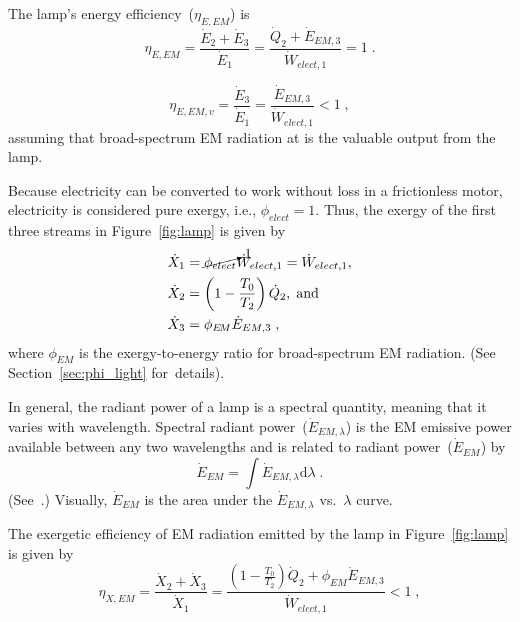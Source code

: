 \documentclass[energies,article,accept,moreauthors,pdftex]{Definitions/mdpi}\usepackage[]{graphicx}\usepackage[]{color}
\newcommand{\EM}{E \! M}
\begin{document}
The lamp's energy efficiency~($\eta_{E,EM}$) is 
\begin{equation}  
  \eta_{E,EM} = \frac{\dot{E}_2 + \dot{E}_3}{\dot{E}_1} = \frac{\dot{Q}_2 + \dot{E}_{EM,3}}{\dot{W}_{elect,1}} = 1 \; .
\end{equation}

\begin{equation} \label{eq:eta_E_v}
  \eta_{E,EM,v} = \frac{\dot{E}_3}{\dot{E}_1} = \frac{\dot{E}_{EM,3}}{\dot{W}_{elect,1}} < 1 \; ,
\end{equation}
%
assuming that broad-spectrum EM radiation at  is the valuable output from the lamp.

Because electricity can be converted to work without loss in a frictionless motor,
electricity is considered pure exergy, i.e., $\phi_{elect} = 1$.
Thus, the exergy of the first three streams in Figure~\ref{fig:lamp} is given by 
\begin{align}
  \dot{X}_1 &= \cancelto{1}{\phi_{elect}} \dot{W}_{elect,1} = \dot{W}_{elect,1}, \\
  \dot{X}_2 &= \left( 1 - \frac{T_0}{T_2} \right) \dot{Q}_2, \; \text{and} \\
  \dot{X}_3 &= \phi_{\EM} \dot{E}_{EM,3} \; ,
\end{align}
%
where $\phi_{EM}$ is the exergy-to-energy ratio for broad-spectrum EM radiation. 
(See Section~\ref{sec:phi_light} \mbox{for details}).

In general, the radiant power of a lamp is a spectral quantity,
meaning that it varies with wavelength.
Spectral radiant power~($\dot{E}_{EM,\lambda}$)
is the EM emissive power available between any two wavelengths
and is related to radiant power~($\dot{E}_{EM}$) by
\begin{equation} \label{eq:emissive_power}
  \dot{E}_{EM} = \int \dot{E}_{EM,\lambda} \mathrm{d}\lambda \; .
\end{equation}
%
(See~\citet{benenson2006handbook}.) Visually, $\dot{E}_{EM}$ is the area under the $\dot{E}_{EM,\lambda}$ vs.\ $\lambda$ curve.%

The exergetic efficiency of EM radiation emitted by the lamp in Figure~\ref{fig:lamp} is given by
\begin{equation}
  \eta_{X,EM} = \frac{\dot{X}_2 + \dot{X}_3}{\dot{X}_1} 
          = \frac{\left( 1 - \frac{T_0}{T_2} \right) \dot{Q}_2 + \phi_{EM} \dot{E}_{EM,3} }{\dot{W}_{elect,1}} < 1 \; ,
\end{equation}
\end{document}
